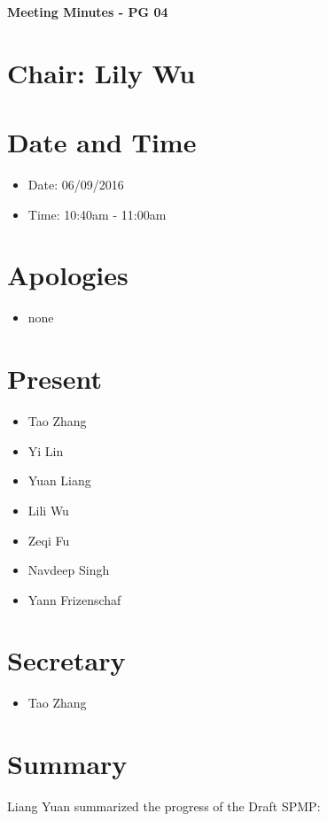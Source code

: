 \documentclass[11pt, a4paper]{article}
\begin{document}
\vspace*{15pt}
\begin{center}
\huge \bf Meeting Minutes - PG 04
\end{center}

\section*{Chair: Lily Wu}
\vspace*{10pt}

\section{Date and Time}
\begin{itemize}
\item Date: 06/09/2016
\item Time: 10:40am - 11:00am
\end{itemize}

\section{Apologies}
\begin{itemize}
\item none
\end{itemize}

\section{Present}
\begin{itemize}
\item Tao Zhang
\item Yi Lin
\item Yuan Liang
\item Lili Wu
\item Zeqi Fu
\item Navdeep Singh
\item Yann Frizenschaf
\end{itemize}

\section{Secretary}
\begin{itemize}
\item Tao Zhang
\end{itemize}

\section{Summary }
Liang Yuan summarized the progress of the Draft SPMP:
\end{document}
